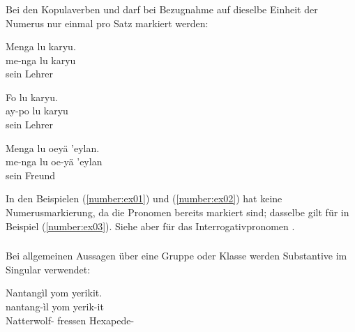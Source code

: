\subsubsection{} Bei den Kopulaverben  und  darf bei Bezugnahme auf dieselbe Einheit der Numerus nur einmal pro Satz markiert werden:\label{syn:noun:concord}

\begin{interlin} \label{number:ex01}
	\glll \Npawl{}Menga lu karyu. \\
	me-nga lu karyu \\
	 sein Lehrer \\
\end{interlin}

\begin{interlin} \label{number:ex02}
	\glll \Npawl{}Fo lu karyu. \\
	ay-po lu karyu \\
	 sein Lehrer \\
\end{interlin}

\begin{interlin} \label{number:ex03}
	\glll \Npawl{}Menga lu oeyä 'eylan. \\
	me-nga lu oe-yä 'eylan \\
	 sein  Freund \\
\end{interlin}

\noindent In den Beispielen (\ref{number:ex01}) und (\ref{number:ex02}) hat  keine Numerusmarkierung, da die Pronomen bereits markiert sind; dasselbe gilt für  in Beispiel (\ref{number:ex03}). Siehe aber  für das Interrogativpronomen .

\subsubsection{} Bei allgemeinen Aussagen über eine Gruppe oder Klasse werden Substantive im Singular verwendet:  

\begin{interlin}
	\glll \Npawl{}Nantangìl yom yerikit. \\
	nantang-ìl yom yerik-it \\
	Natterwolf- fressen Hexapede- \\
\end{interlin}


